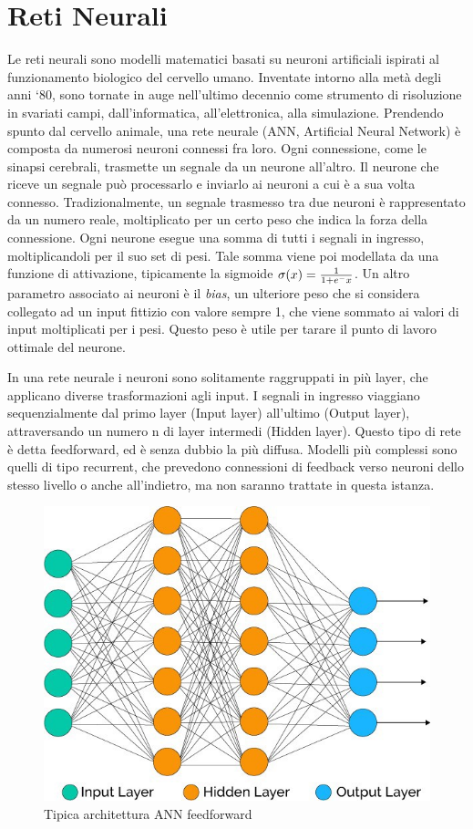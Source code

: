 \documentclass{article}
\begin{document}
\section{Reti Neurali}
Le reti neurali sono modelli matematici basati su neuroni artificiali ispirati al funzionamento biologico del cervello umano. Inventate intorno alla metà degli anni `80, sono tornate in auge nell'ultimo decennio come strumento di risoluzione in svariati campi, dall'informatica, all'elettronica, alla simulazione. 
Prendendo spunto dal cervello animale, una rete neurale (ANN, Artificial Neural Network) è composta da numerosi neuroni connessi fra loro. Ogni connessione, come le sinapsi cerebrali, trasmette un segnale da un neurone all'altro. Il neurone che riceve un segnale può processarlo e inviarlo ai neuroni a cui è a sua volta connesso. Tradizionalmente, un segnale trasmesso tra due neuroni è rappresentato da un numero reale, moltiplicato per un certo peso che indica la forza della connessione. Ogni neurone esegue una somma di tutti i segnali in ingresso, moltiplicandoli per il suo set di pesi. Tale somma viene poi modellata da una funzione di attivazione, tipicamente la sigmoide
$\sigma(x) = {1 \over 1+e^-x}$. Un altro parametro associato ai neuroni è il \textit{bias}, un ulteriore peso che si considera collegato ad un input fittizio con valore sempre 1, che viene sommato ai valori di input moltiplicati per i pesi. Questo peso è utile per tarare il punto di lavoro ottimale del neurone.

In una rete neurale i neuroni sono solitamente raggruppati in più layer, che applicano diverse trasformazioni agli input. I segnali in ingresso viaggiano sequenzialmente dal primo layer (Input layer) all'ultimo (Output layer), attraversando un numero n di layer intermedi (Hidden layer). Questo tipo di rete è detta feedforward, ed è senza dubbio la più diffusa. Modelli più complessi sono quelli di tipo recurrent, che prevedono connessioni di feedback verso neuroni dello stesso livello o anche all'indietro, ma non saranno trattate in questa istanza.

\begin{figure}[!h]
\centering
\includegraphics[scale=0.3]{linear}
\caption{Tipica architettura ANN feedforward}
\end{figure}
\end{document}
